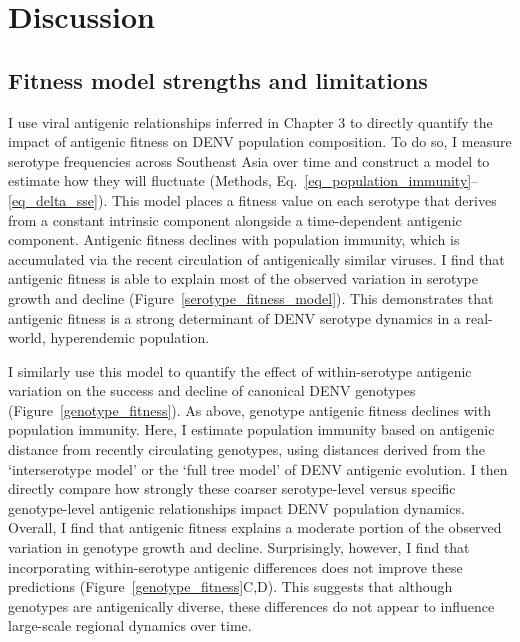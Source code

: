 
\section{Discussion}
\subsection{Fitness model strengths and limitations}
I use viral antigenic relationships inferred in Chapter 3 to directly quantify the impact of antigenic fitness on DENV population composition.
To do so, I measure serotype frequencies across Southeast Asia over time and construct a model to estimate how they will fluctuate (Methods, Eq.~\ref{eq_population_immunity}--\ref{eq_delta_sse}).
This model places a fitness value on each serotype that derives from a constant intrinsic component alongside a time-dependent antigenic component.
Antigenic fitness declines with population immunity, which is accumulated via the recent circulation of antigenically similar viruses.
I find that antigenic fitness is able to explain most of the observed variation in serotype growth and decline (Figure~\ref{serotype_fitness_model}).
This demonstrates that antigenic fitness is a strong determinant of DENV serotype dynamics in a real-world, hyperendemic population.

I similarly use this model to quantify the effect of within-serotype antigenic variation on the success and decline of canonical DENV genotypes (Figure~\ref{genotype_fitness}).
As above, genotype antigenic fitness declines with population immunity.
Here, I estimate population immunity based on antigenic distance from recently circulating genotypes, using distances derived from the `interserotype model' or the `full tree model' of DENV antigenic evolution.
I then directly compare how strongly these coarser serotype-level versus specific genotype-level antigenic relationships impact DENV population dynamics.
Overall, I find that antigenic fitness explains a moderate portion of the observed variation in genotype growth and decline.
Surprisingly, however, I find that incorporating within-serotype antigenic differences does not improve these predictions (Figure~\ref{genotype_fitness}C,D).
This suggests that although genotypes are antigenically diverse, these differences do not appear to influence large-scale regional dynamics over time.

